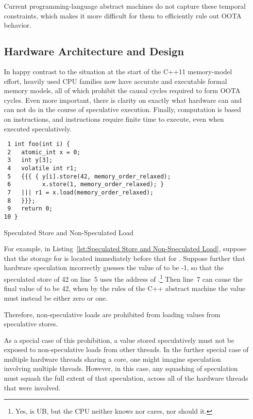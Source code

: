 \documentclass[10]{article}
\begin{document}
Current programming-language abstract machines do not capture these
temporal constraints, which makes it more difficult for them to
efficiently rule out OOTA behavior.

\subsection{Hardware Architecture and Design}
\label{sec:Hardware Architecture and Design}

In happy contrast to the situation at the start of the C++11 memory-model
effort, heavily used CPU families now have accurate and executable formal
memory models, all of which prohibit the causal cycles required to form
OOTA cycles.
Even more important, there is clarity on exactly what hardware can and
can not do in the course of speculative execution.
Finally, computation is based on instructions, and instructions require
finite time to execute, even when executed speculatively.

\begin{listing}[tbp]
\begin{verbatim}
 1 int foo(int i) {
 2   atomic_int x = 0;
 3   int y[3];
 4   volatile int r1;
 5   {{{ { y[i].store(42, memory_order_relaxed);
 6         x.store(1, memory_order_relaxed); }
 7   ||| r1 = x.load(memory_order_relaxed);
 8   }}};
 9   return 0;
10 }
\end{verbatim}
\caption{Speculated Store and Non-Speculated Load}
\label{lst:Speculated Store and Non-Speculated Load}
\end{listing}

For example, in Listing~\ref{lst:Speculated Store and Non-Speculated Load},
suppose that the storage for  is located immediately before that
for .
Suppose further that hardware speculation incorrectly guesses the value
of  to be -1, so that the speculated store of 42 on line~5 uses
the address of .\footnote{
	Yes,  is UB, but the CPU neither knows
	nor cares, nor should it.}
Then line~7 can cause the final value of  to be 42, when
by the rules of the C++ abstract machine the value must instead be
either zero or one.

Therefore, non-speculative loads are prohibited from loading values from
speculative stores.

As a special case of this prohibition, a value stored speculatively must
not be exposed to non-speculative loads from other threads.
In the further special case of multiple hardware threads sharing a core,
one might imagine speculation involving multiple threads.
However, in this case, any squashing of speculation must squash the
full extent of that speculation, across all of the hardware threads
that were involved.
\end{document}
